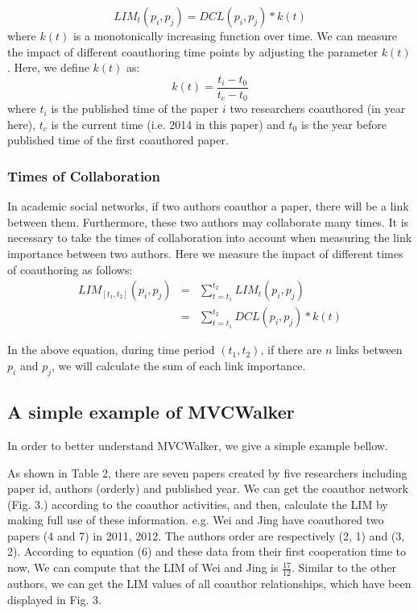 \documentclass[10pt,journal,compsoc]{IEEEtran}
\begin{document}
\begin{equation}
LIM_{t}(p_{i}, p_{j})=DCL(p_{i}, p_{j})\ast k(t)
\end{equation}
where $k(t)$ is a monotonically increasing function over time. We can measure the impact of different coauthoring time points by adjusting the parameter $k(t)$. Here, we define $k(t)$ as:
\begin{equation}
k(t)=\frac{t_{i}-t_{0}}{t_{c}-t_{0}}
\end{equation}
where $t_{i}$ is the published time of the paper $i$ two researchers coauthored (in year here), $t_{c}$ is the current time (i.e. 2014 in this paper) and $t_{0}$ is the year before published time of the first coauthored paper.

\subsubsection{Times of Collaboration}
In academic social networks, if two authors coauthor a paper, there will be a link between them. Furthermore, these two authors may collaborate many times. It is necessary to take the times of collaboration into account when measuring the link importance between two authors. Here we measure the impact of different times of coauthoring as follows:
\begin{eqnarray}
LIM_{[t_{1}, t_{2}]}(p_{i}, p_{j})&=&\sum_{t=t_{1}}^{t_{2}}LIM_{t}(p_{i}, p_{j}) \nonumber\\
                       &=&\sum_{t=t_{1}}^{t_{2}}DCL(p_{i}, p_{j})\ast k(t)
\end{eqnarray}

In the above equation, during time period $(t_{1}, t_{2})$, if there are $n$ links between $p_{i}$ and $p_{j}$, we will calculate the sum of each link importance.

\subsection{A simple example of MVCWalker}
In order to better understand MVCWalker, we give a simple example bellow.

As shown in Table 2, there are seven papers created by five researchers including paper id, authors (orderly) and published year. We can get the coauthor network (Fig. 3.) according to the coauthor activities, and then, calculate the LIM by making full use of these information. e.g. Wei and Jing have coauthored two papers (4 and 7) in 2011, 2012. The authors order are respectively (2, 1) and (3, 2). According to equation (6) and these data from their first cooperation time to now, We can compute that the LIM of Wei and Jing is $\frac{17}{12}$. Similar to the other authors, we can get the LIM values of all coauthor relationships, which have been displayed in Fig. 3.
\end{document}

